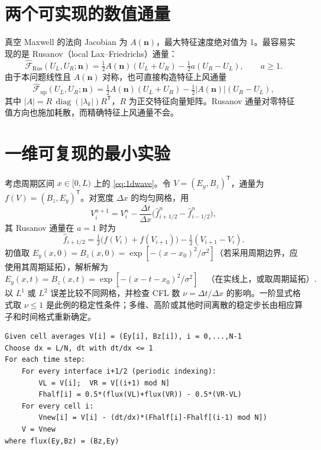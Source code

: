\documentclass[UTF8,11pt,openany]{ctexbook}
\numberwithin{equation}{chapter}
\theoremstyle{definition}
\theoremstyle{remark}
\newcommand{\abs}[1]{\left\lvert #1\right\rvert}
\begin{document}
\section{两个可实现的数值通量}
真空 Maxwell 的法向 Jacobian 为 $A(\bm n)$，最大特征速度绝对值为 1。最容易实现的是 Rusanov（local Lax--Friedrichs）通量：
\begin{equation}\label{eq:rusanov}
\widehat{\mathcal F}_{\mathrm{Rus}}(U_L,U_R;\bm n)
=\tfrac12 A(\bm n)(U_L+U_R)-\tfrac12 a(U_R-U_L),\qquad a\geq1.
\end{equation}
由于本问题线性且 $A(\bm n)$ 对称，也可直接构造特征上风通量
\begin{equation}\label{eq:upwind}
\widehat{\mathcal F}_{\mathrm{up}}(U_L,U_R;\bm n)
=\tfrac12 A(\bm n)(U_L+U_R)
-\tfrac12\abs{A(\bm n)}(U_R-U_L),
\end{equation}
其中 $\abs A=R\,\operatorname{diag}(|\lambda_k|)R^\mathsf T$，$R$ 为正交特征向量矩阵。Rusanov 通量对零特征值方向也施加耗散，而精确特征上风通量不会。

\section{一维可复现的最小实验}
考虑周期区间 $x\in[0,L)$ 上的 \eqref{eq:1dwave}。令 $V=(E_y,B_z)^\mathsf T$，通量为 $f(V)=(B_z,E_y)^\mathsf T$。对宽度 $\Delta x$ 的均匀网格，用
\begin{equation}\label{eq:1dfv}
V_i^{n+1}=V_i^n-\frac{\Delta t}{\Delta x}
\bigl(\widehat f_{i+1/2}^n-\widehat f_{i-1/2}^n\bigr),
\end{equation}
其 Rusanov 通量在 $a=1$ 时为
\begin{equation}
\widehat f_{i+1/2}=\tfrac12\bigl(f(V_i)+f(V_{i+1})\bigr)-\tfrac12(V_{i+1}-V_i).
\end{equation}
初值取 $E_y(x,0)=B_z(x,0)=\exp[-(x-x_0)^2/\sigma^2]$（若采用周期边界，应使用其周期延拓），解析解为
\begin{equation}
E_y(x,t)=B_z(x,t)=\exp[-(x-t-x_0)^2/\sigma^2]
\quad\text{（在实线上，或取周期延拓）}.
\end{equation}
以 $L^1$ 或 $L^2$ 误差比较不同网格，并检查 CFL 数 $\nu=\Delta t/\Delta x$ 的影响。一阶显式格式取 $\nu\leq1$ 是此例的稳定性条件；多维、高阶或其他时间离散的稳定步长由相应算子和时间格式重新确定。

\begin{lstlisting}[caption={一维周期网格的 Rusanov 有限体积更新（伪代码）}]
Given cell averages V[i] = (Ey[i], Bz[i]), i = 0,...,N-1
Choose dx = L/N, dt with dt/dx <= 1
For each time step:
    For every interface i+1/2 (periodic indexing):
        VL = V[i];  VR = V[(i+1) mod N]
        Fhalf[i] = 0.5*(flux(VL)+flux(VR)) - 0.5*(VR-VL)
    For every cell i:
        Vnew[i] = V[i] - (dt/dx)*(Fhalf[i]-Fhalf[(i-1) mod N])
    V = Vnew
where flux(Ey,Bz) = (Bz,Ey)
\end{lstlisting}
\end{document}
